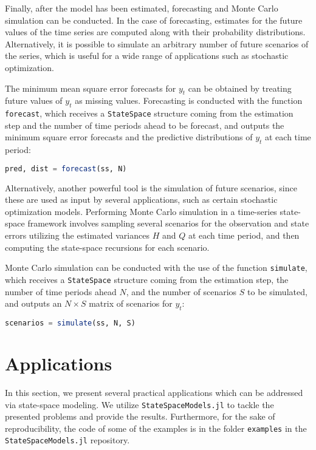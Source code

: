 \documentclass{juliacon}
\begin{document}
Finally, after the model has been estimated, forecasting and Monte Carlo simulation can be conducted. In the case of forecasting, estimates for the future values of the time series are computed along with their probability distributions. Alternatively, it is possible to simulate an arbitrary number of future scenarios of the series, which is useful for a wide range of applications such as stochastic optimization.

The minimum mean square error forecasts for $y_{t}$ can be obtained by treating future values of $y_{t}$ as missing values. Forecasting is conducted with the function \texttt{forecast}, which receives a \texttt{StateSpace} structure coming from the estimation step and the number of time periods ahead to be forecast, and outputs the minimum square error forecasts and the predictive distributions of $y_{t}$ at each time period:
%
\begin{lstlisting}[language = Julia]
pred, dist = forecast(ss, N)
\end{lstlisting}
%
Alternatively, another powerful tool is the simulation of future scenarios, since these are used as input by several applications, such as certain stochastic optimization models. Performing Monte Carlo simulation in a time-series state-space framework involves sampling several scenarios for the observation and state errors utilizing the estimated variances $H$ and $Q$ at each time period, and then computing the state-space recursions for each scenario.

Monte Carlo simulation can be conducted with the use of the function \texttt{simulate}, which receives a \texttt{StateSpace} structure coming from the estimation step, the number of time periods ahead $N$, and the number of scenarios $S$ to be simulated, and outputs an $N \times S$ matrix of scenarios for $y_{t}$:
%
\begin{lstlisting}[language = Julia]
scenarios = simulate(ss, N, S)
\end{lstlisting}

\section{Applications} \label{sec:applications}

In this section, we present several practical applications which can be addressed via state-space modeling. We utilize \texttt{StateSpaceModels.jl} to tackle the presented problems and provide the results. Furthermore, for the sake of reproducibility, the code of some of the examples is in the folder \texttt{examples} in the \texttt{StateSpaceModels.jl} repository.
\end{document}
